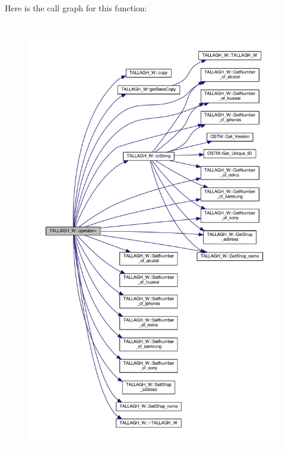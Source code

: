 Here is the call graph for this function\+:\nopagebreak
\begin{figure}[H]
\begin{center}
\leavevmode
\includegraphics[height=550pt]{class_t_a_l_l_a_g_h___w_a0ac3db0bae78cc4e59f175e90374ed50_a0ac3db0bae78cc4e59f175e90374ed50_cgraph}
\end{center}
\end{figure}



